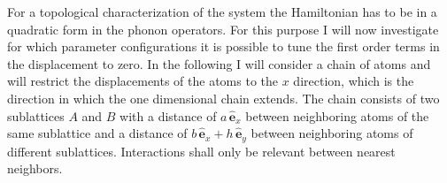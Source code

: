 For a topological characterization of the system the Hamiltonian has to be in a quadratic form in the phonon operators. For this purpose I will now investigate for which parameter configurations it is possible to tune the first order terms in the displacement to zero. In the following I will consider a chain of atoms and will restrict the displacements of the atoms to the $x$ direction, which is the direction in which the one dimensional chain extends. The chain consists of two sublattices $A$ and $B$ with a distance of $a\,\hat{\mathbf{e}}_x$ between neighboring atoms of the same sublattice and a distance of $b\,\hat{\mathbf{e}}_x+h\,\hat{\mathbf{e}}_y$ between neighboring atoms of different sublattices. Interactions shall only be relevant between nearest neighbors.


